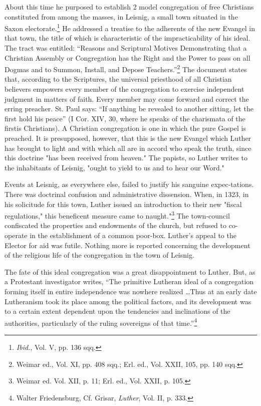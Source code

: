 About this time he purposed to establish 2 model congregation of free
Christians constituted from among the masses, in Leisnig, a small town situated
in the Saxon electorate.\footnote{\textit{Ibid.}, Vol. V, pp. 136 sqq.}
He addressed a treatise to the adherents of
the new Evangel in that town, the title of which is characteristic of the
impracticability of his ideal. The tract was entitled: “Reasons and Scriptural
Motives Demonstrating that a Christian Assembly or Congregation has the
Right and the Power to pass on all Dogmas and to Summon, Install, and
Depose Teachers.”\footnote{Weimar ed., Vol. XI, pp. 408 sqq.; Erl. ed., Vol. XXII, 105, pp. 140 sqq.}
The document states that, according to the Scriptures,
the universal priesthood of all Christian believers empowers every member
of the congregation to exercise independent judgment in matters of faith.
Every member may come forward and correct the erring preacher. St. Paul
says: “If anything be revealed to another sitting, let the first hold his
peace” (I Cor. XIV, 30, where he speaks of the charismata of the firstis
Christians). A Christian congregation is one in which the pure Gospel is
preached. It is presupposed, however, that this is the new Evangel which
Luther has brought to light and with which all are in accord who
speak the truth, since this doctrine "has been received from heaven."
The papists, so Luther writes to the inhabitants of Leisnig, "ought to
yield to us and to hear our Word."

Events at Leisnig, as everywhere else,
failed to justify his sanguine expec-tations. There was doctrinal confusion
and administrative dissension. When, in 1323, in his solicitude for this
town, Luther issued an introduction to their new "fiscal regulations,"
this beneficent measure came to naught."\footnote{Weimar ed. Vol. XII, p. 11; Erl. ed., Vol. XXII, p. 105.}
The town-council confiscated the properties and endowments of the church,
but refused to co-operate in the establishment of a common poor-box.
Luther’s appeal to the Elector for aid was futile. Nothing more is reported
concerning the development of the religious life of the congregation in the
town of Leisnig.

The fate of this ideal congregation was a great disappointment to
Luther. But, as a Protestant investigator writes, “The primitive
Lutheran ideal of a congregation forming itself in entire independence
was nowhere realized \dots Thus at an early date Lutheranism took
its place among the political factors, and its development was to a
certain extent dependent upon the tendencies and inclinations of the
authorities, particularly of the ruling sovereigns of that time.”\footnote
{Walter Friedensburg, Cf. Grisar, \textit{Luther}, Vol. II, p. 333.}

